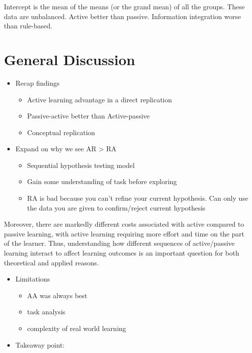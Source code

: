 \documentclass[10pt, letterpaper]{article}
\begin{document}
Intercept is the mean of the means (or the grand mean) of all the
groups. These data are unbalanced. Active better than passive.
Information integration worse than rule-based.

\section{General Discussion}\label{general-discussion}

\begin{itemize}
\itemsep1pt\parskip0pt
\item
  Recap findings

  \begin{itemize}
  \itemsep1pt\parskip0pt
  \item
    Active learning advantage in a direct replication
  \item
    Passive-active better than Active-passive
  \item
    Conceptual replication
  \end{itemize}
\item
  Expand on why we see AR \textgreater{} RA

  \begin{itemize}
  \itemsep1pt\parskip0pt
  \item
    Sequential hypothesis testing model
  \item
    Gain some understanding of task before exploring
  \item
    RA is bad because you can't refine your current hypothesis. Can only
    use the data you are given to confirm/reject current hypothesis
  \end{itemize}
\end{itemize}

Moreover, there are markedly different costs associated with active
compared to passive learning, with active learning requiring more effort
and time on the part of the learner. Thus, understanding how different
sequences of active/passive learning interact to affect learning
outcomes is an important question for both theoretical and applied
reasons.

\begin{itemize}
\itemsep1pt\parskip0pt
\item
  Limitations

  \begin{itemize}
  \itemsep1pt\parskip0pt
  \item
    AA was always best
  \item
    task analysis
  \item
    complexity of real world learning
  \end{itemize}
\item
  Takeaway point:
\end{itemize}
\end{document}
